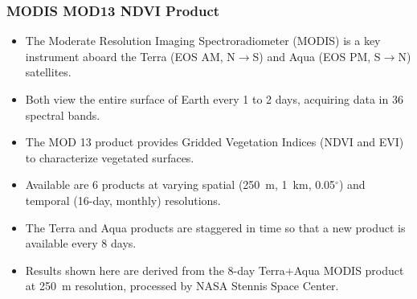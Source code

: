 {
\begin{frame}
 \frametitle{MODIS MOD13 NDVI Product}
 \begin{itemize}\color{white}
  \item The Moderate Resolution Imaging Spectroradiometer (MODIS) is a key instrument aboard the Terra (EOS AM, N$\rightarrow$S) and Aqua (EOS PM, S$\rightarrow$N) satellites.
  \item Both view the entire surface of Earth every 1 to 2 days, acquiring data in 36 spectral bands.
  \item The MOD 13 product provides Gridded Vegetation Indices (NDVI and EVI) to characterize vegetated surfaces.
  \item Available are 6 products at varying spatial (250~m, 1~km, 0.05$^\circ$) and temporal (16-day, monthly) resolutions.
  \item The Terra and Aqua products are staggered in time so that a new product is available every 8 days.
  \item Results shown here are derived from the 8-day Terra+Aqua  MODIS product at 250~m resolution, processed by NASA Stennis Space Center.
 \end{itemize}
\end{frame}
}

